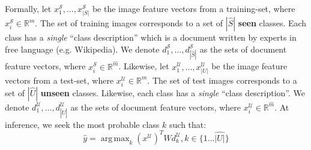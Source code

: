 \documentclass[11pt,a4paper]{article}
\DeclareMathOperator*{\argmax}{arg\,max}
\begin{document}



Formally, let $x^{\mathcal{S}}_1,\ldots,x^{\mathcal{S}}_{|S|}$ be the image feature vectors from a training-set, where $x^{\mathcal{S}}_i\in \mathbb{R}^{m}$. The set of training images corresponds to a set of $|\hat{S}|$ \textbf{seen} classes. Each class has a \textit{single} \enquote{class description} which is a document written by experts in free language (e.g. Wikipedia). We denote $d^{\mathcal{S}}_1,\ldots,d^{\mathcal{S}}_{|\hat{S}|}$ as the sets of document feature vectors, 
where $x^{\mathcal{S}}_i\in \mathbb{R}^{\hat{m}}$.
Likewise, let $x^{\mathcal{U}}_1,\ldots,x^{\mathcal{U}}_{|U|}$ be the image feature vectors from a test-set, where $x^{\mathcal{U}}_i\in \mathbb{R}^{m}$. The set of test images corresponds to a set of $|\hat{U}|$ \textbf{unseen} classes. Likewise, each class has a \textit{single} \enquote{class description}. We denote $d^{\mathcal{U}}_1,\ldots,d^{\mathcal{U}}_{|\hat{U}|}$ as the sets of document feature vectors, 
where $x^{\mathcal{U}}_i\in \mathbb{R}^{\hat{m}}$.
At inference, we seek the most probable class \(k\) such that:
\begin{equation}
  \label{equation:attention}
  {\hat{y}}=\argmax_{k} \left( x^{\mathcal{U}} \right) ^{T}Wd^{\mathcal{U}}_{k}, k \in \{1 \dots \hat{|U|}\}
\end{equation}
\end{document}
